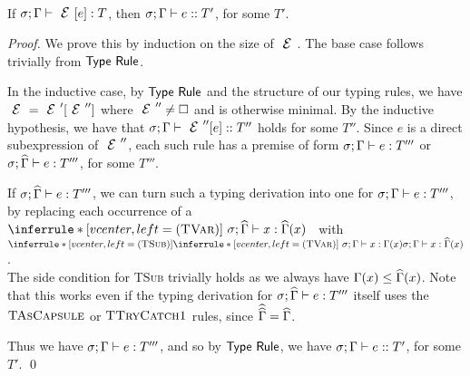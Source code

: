 \SS\begin{Corollary}\ \\
	\indent If $\ty{\E[e]}T$, then $\tye{e}{T'}$, for some $T'$.
\end{Corollary}
\SS\begin{proof}
	We prove this by induction on the size of $\E$.
	The base case follows trivially from $\textsf{Type Rule}$.

	In the inductive case, by $\textsf{Type Rule}$ and the structure of our typing rules, we have $\E = \E'[\E'']$ where $\E'' \neq \hole$ and is otherwise minimal.
	By the inductive hypothesis, we have that $\tye{\E''[e]}{T''}$ holds for some $T''$.
	Since $e$ is a direct subexpression of $\E''$, each such rule has a premise of form $\ty e{T'''}$ or $\ty[\s][\demut{\G}]e{T'''}$, for some $T'''$.
	
	If $\ty[\s][\demut{\G}]e{T'''}$, we can turn such a typing derivation into one for $\ty e{T'''}$,\\
	\indent by replacing each occurrence of a $\irule{TVar}{\ }{\ty[\s][\demut{\G}]x{\demut{\G}(x)}}$ \ with\ \  $\irule{TSub}{\irule{TVar}{\ }{\ty x{\G(x)}}}{\ty x{\demut{\G}(x)}}$.\\
	The side condition for \textsc{TSub} trivially holds as we always have $\Gamma(x) \leq \widehat{\Gamma}(x)$.
	Note that this works even if the typing derivation for $\ty[\s][\demut{\G}]e{T'''}$ itself uses the $\textsc{TAsCapsule}$ or $\textsc{TTryCatch1}$ rules, since $\widehat{\widehat{\Gamma}} = \widehat{\Gamma}$.
	
	Thus we have $\ty e{T'''}$, and so by $\textsf{Type Rule}$, we have $\tye e{T'}$, for some $T'$.
\qed\end{proof}

